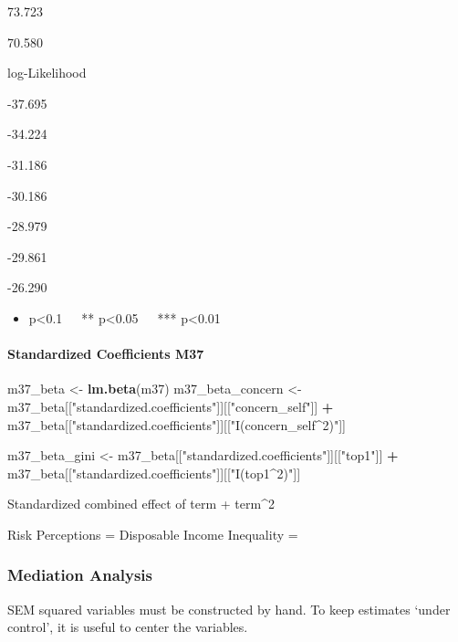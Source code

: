 \documentclass[
]{article}
\newenvironment{Shaded}{\begin{snugshade}}{\end{snugshade}}
\newcommand{\KeywordTok}[1]{\textcolor[rgb]{0.13,0.29,0.53}{\textbf{#1}}}
\newcommand{\NormalTok}[1]{#1}
\newcommand{\OperatorTok}[1]{\textcolor[rgb]{0.81,0.36,0.00}{\textbf{#1}}}
\newcommand{\StringTok}[1]{\textcolor[rgb]{0.31,0.60,0.02}{#1}}
\providecommand{\tightlist}{%
  \setlength{\itemsep}{0pt}\setlength{\parskip}{0pt}}
\begin{document}
73.723

70.580

log-Likelihood

-37.695

-34.224

-31.186

-30.186

-28.979

-29.861

-26.290

\begin{itemize}
\tightlist
\item
  p\textless0.1~~~** p\textless0.05~~~*** p\textless0.01
\end{itemize}

\hypertarget{standardized-coefficients-m37}{%
\paragraph{Standardized Coefficients
M37}\label{standardized-coefficients-m37}}

\begin{Shaded}
\begin{Highlighting}[]
\NormalTok{m37_beta <-}\StringTok{ }\KeywordTok{lm.beta}\NormalTok{(m37)}
\NormalTok{m37_beta_concern <-}\StringTok{ }\NormalTok{m37_beta[[}\StringTok{"standardized.coefficients"}\NormalTok{]][[}\StringTok{"concern_self"}\NormalTok{]] }\OperatorTok{+}\StringTok{ }\NormalTok{m37_beta[[}\StringTok{"standardized.coefficients"}\NormalTok{]][[}\StringTok{"I(concern_self^2)"}\NormalTok{]]}

\NormalTok{m37_beta_gini <-}\StringTok{ }\NormalTok{m37_beta[[}\StringTok{"standardized.coefficients"}\NormalTok{]][[}\StringTok{"top1"}\NormalTok{]] }\OperatorTok{+}\StringTok{ }\NormalTok{m37_beta[[}\StringTok{"standardized.coefficients"}\NormalTok{]][[}\StringTok{"I(top1^2)"}\NormalTok{]]}
\end{Highlighting}
\end{Shaded}

Standardized combined effect of term + term\^{}2

Risk Perceptions = Disposable Income Inequality =

\hypertarget{mediation-analysis}{%
\subsubsection{Mediation Analysis}\label{mediation-analysis}}

SEM squared variables must be constructed by hand. To keep estimates
`under control', it is useful to center the variables.
\end{document}
